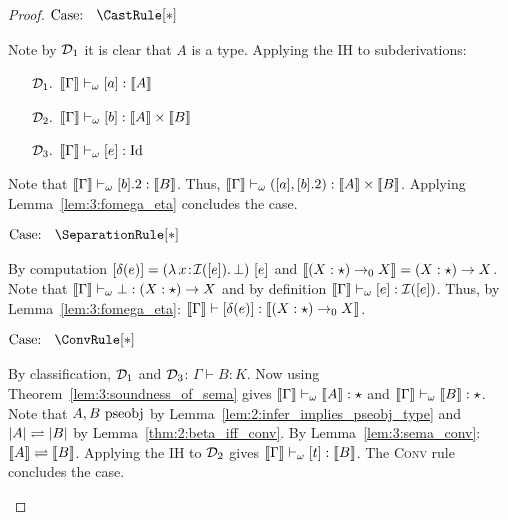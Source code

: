 \begin{proof}
    $\text{Case: }\begin{array}{c} \CastRule[*] \end{array}$
    \begin{proofcase}
        Note by $\mathcal{D}_{1}$ it is clear that $A$ is a type.
        Applying the IH to subderivations:
        \begin{enumerate}
            \item[$\mathcal{D}_{1}.$] $\llbracket \Gamma \rrbracket \vdash_\omega [a] : \llbracket A \rrbracket$
            \item[$\mathcal{D}_{2}.$] $\llbracket \Gamma \rrbracket \vdash_\omega [b] : \llbracket A \rrbracket \times \llbracket B \rrbracket$
            \item[$\mathcal{D}_{3}.$] $\llbracket \Gamma \rrbracket \vdash_\omega [e] : \textnormal{Id}$
        \end{enumerate}
        Note that $\llbracket \Gamma \rrbracket \vdash_\omega [b].2 : \llbracket B \rrbracket$.
        Thus, $\llbracket \Gamma \rrbracket \vdash_\omega ([a], [b].2) : \llbracket A \rrbracket \times \llbracket B \rrbracket$.
        Applying Lemma~\ref{lem:3:fomega_eta} concludes the case.
    \end{proofcase}

    $\text{Case: }\begin{array}{c} \SeparationRule[*] \end{array}$
    \begin{proofcase}
        By computation $[\delta(e)] = ({\lambda}\, x\! : \! \mathcal{I}([e]).\, \bot)\ [e]$ and $\llbracket (X : \star) \to_0 X \rrbracket = (X : \star) \to X$.
        Note that $\llbracket \Gamma \rrbracket \vdash_\omega \bot : (X : \star) \to X$ and by definition $\llbracket \Gamma \rrbracket \vdash_\omega [e] : \mathcal{I}([e])$.
        Thus, by Lemma~\ref{lem:3:fomega_eta}: $\llbracket \Gamma \rrbracket \vdash [\delta(e)] : \llbracket (X : \star) \to_0 X \rrbracket$.
    \end{proofcase}

    $\text{Case: }\begin{array}{c} \ConvRule[*] \end{array}$
    \begin{proofcase}
        By classification, $\mathcal{D}_{1}$ and $\mathcal{D}_{3}$: $\Gamma \vdash B : K$.
        Now using Theorem~\ref{lem:3:soundness_of_sema} gives $\llbracket \Gamma \rrbracket \vdash_\omega \llbracket A \rrbracket : \star$ and $\llbracket \Gamma \rrbracket \vdash_\omega \llbracket B \rrbracket : \star$.
        Note that $A,B~\textnormal{pseobj}$ by Lemma~\ref{lem:2:infer_implies_pseobj_type} and $|A| \rightleftharpoons |B|$ by Lemma~\ref{thm:2:beta_iff_conv}.
        By Lemma~\ref{lem:3:sema_conv}: $\llbracket A \rrbracket \rightleftharpoons \llbracket B \rrbracket$.
        Applying the IH to $\mathcal{D}_{2}$ gives $\llbracket \Gamma \rrbracket \vdash_\omega [t] : \llbracket B \rrbracket$.
        The \textsc{Conv} rule concludes the case.
    \end{proofcase}
\end{proof}

